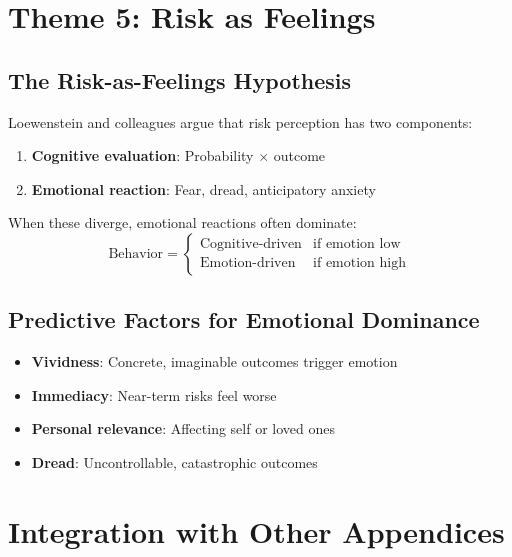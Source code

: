 \section{Theme 5: Risk as Feelings}
\label{sec:lo-risk}

\subsection{The Risk-as-Feelings Hypothesis}

Loewenstein and colleagues \citep{PAP-loewenstein2000emotions} argue that risk perception has two components:

\begin{enumerate}[nosep]
\item \textbf{Cognitive evaluation}: Probability $\times$ outcome
\item \textbf{Emotional reaction}: Fear, dread, anticipatory anxiety
\end{enumerate}

When these diverge, emotional reactions often dominate:
\begin{equation}
\text{Behavior} = \begin{cases}
\text{Cognitive-driven} & \text{if emotion low} \\
\text{Emotion-driven} & \text{if emotion high}
\end{cases}
\end{equation}

\subsection{Predictive Factors for Emotional Dominance}

\begin{itemize}[nosep]
\item \textbf{Vividness}: Concrete, imaginable outcomes trigger emotion
\item \textbf{Immediacy}: Near-term risks feel worse
\item \textbf{Personal relevance}: Affecting self or loved ones
\item \textbf{Dread}: Uncontrollable, catastrophic outcomes
\end{itemize}


\section{Integration with Other Appendices}
\label{sec:lo-integration}

